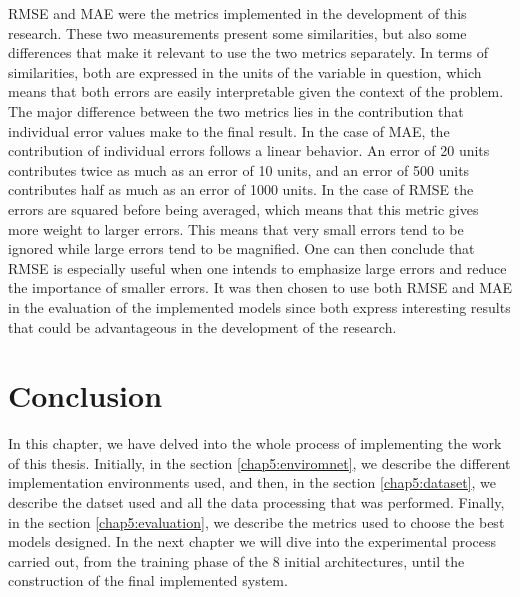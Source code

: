 \ac{RMSE} and \ac{MAE} were the metrics implemented in the development of this research. These two measurements present some similarities, but also some differences that make it relevant to use the two metrics separately. In terms of similarities, both are expressed in the units of the variable in question, which means that both errors are easily interpretable given the context of the problem. The major difference between the two metrics lies in the contribution that individual error values make to the final result. In the case of \ac{MAE}, the contribution of individual errors follows a linear behavior. An error of 20 units contributes twice as much as an error of 10 units, and an error of 500 units contributes half as much as an error of 1000 units. In the case of \ac{RMSE} the errors are squared before being averaged, which means that this metric gives more weight to larger errors.  This means that very small errors tend to be ignored while large errors tend to be magnified. One can then conclude that \ac{RMSE} is especially useful when one intends to emphasize large errors and reduce the importance of smaller errors. It was then chosen to use both \ac{RMSE} and \ac{MAE} in the evaluation of the implemented models since both express interesting results that could be advantageous in the development of the research.


\section{Conclusion}

In this chapter, we have delved into the whole process of implementing the work of this thesis. Initially, in the section \ref{chap5:enviromnet}, we describe the different implementation environments used, and then, in the section \ref{chap5:dataset}, we describe the datset used and all the data processing that was performed. Finally, in the section \ref{chap5:evaluation}, we describe the metrics used to choose the best models designed. In the next chapter we will dive into the experimental process carried out, from the training phase of the 8 initial architectures, until the construction of the final implemented system.